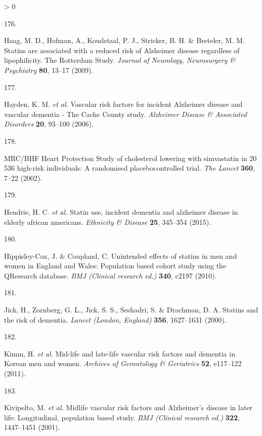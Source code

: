 \documentclass[a4paper, twoside]{templates/ociamthesis}
\newlength{\cslhangindent}
\newlength{\csllabelwidth}
\newenvironment{CSLReferences}[3] %
 {%
  \setlength{\parindent}{0pt}
  \ifodd #1 \everypar{\setlength{\hangindent}{\cslhangindent}}\ignorespaces\fi
  \ifnum #2 > 0
  \setlength{\parskip}{#2\baselineskip}
  \fi
 }%
 {}
\newcommand{\CSLLeftMargin}[1]{\parbox[t]{\maxof{\widthof{#1}}{\csllabelwidth}}{#1}}
\newcommand{\CSLRightInline}[1]{\parbox[t]{\linewidth - \csllabelwidth}{#1}}
\begin{document}
\begin{CSLReferences}{0}{0}
\leavevmode\hypertarget{ref-haag2009}{}%
\CSLLeftMargin{176. }
\CSLRightInline{Haag, M. D., Hofman, A., Koudstaal, P. J., Stricker, B. H. \& Breteler, M. M. Statins are associated with a reduced risk of {Alzheimer} disease regardless of lipophilicity. {The Rotterdam Study}. \emph{Journal of Neurology, Neurosurgery \& Psychiatry} \textbf{80}, 13--17 (2009).}

\leavevmode\hypertarget{ref-hayden2006}{}%
\CSLLeftMargin{177. }
\CSLRightInline{Hayden, K. M. \emph{et al.} Vascular risk factors for incident {Alzheimer} disease and vascular dementia - {The Cache County} study. \emph{Alzheimer Disease \& Associated Disorders} \textbf{20}, 93--100 (2006).}

\leavevmode\hypertarget{ref-heartprotectionstudycollaborativegroup2002}{}%
\CSLLeftMargin{178. }
\CSLRightInline{{MRC}/{BHF Heart Protection Study} of cholesterol lowering with simvastatin in 20 536 high-risk individuals: A randomised placebocontrolled trial. \emph{The Lancet} \textbf{360}, 7--22 (2002).}

\leavevmode\hypertarget{ref-hendrie2015}{}%
\CSLLeftMargin{179. }
\CSLRightInline{Hendrie, H. C. \emph{et al.} Statin use, incident dementia and alzheimer disease in elderly african americans. \emph{Ethnicity \& Disease} \textbf{25}, 345--354 (2015).}

\leavevmode\hypertarget{ref-hippisley-cox2010a}{}%
\CSLLeftMargin{180. }
\CSLRightInline{Hippisley-Cox, J. \& Coupland, C. Unintended effects of statins in men and women in {England} and {Wales}: Population based cohort study using the {QResearch} database. \emph{BMJ (Clinical research ed.)} \textbf{340}, c2197 (2010).}

\leavevmode\hypertarget{ref-jick2000}{}%
\CSLLeftMargin{181. }
\CSLRightInline{Jick, H., Zornberg, G. L., Jick, S. S., Seshadri, S. \& Drachman, D. A. Statins and the risk of dementia. \emph{Lancet (London, England)} \textbf{356}, 1627--1631 (2000).}

\leavevmode\hypertarget{ref-kimm2011}{}%
\CSLLeftMargin{182. }
\CSLRightInline{Kimm, H. \emph{et al.} Mid-life and late-life vascular risk factors and dementia in {Korean} men and women. \emph{Archives of Gerontology \& Geriatrics} \textbf{52}, e117--122 (2011).}

\leavevmode\hypertarget{ref-kivipelto2001}{}%
\CSLLeftMargin{183. }
\CSLRightInline{Kivipelto, M. \emph{et al.} Midlife vascular risk factors and {Alzheimer}'s disease in later life: Longitudinal, population based study. \emph{BMJ (Clinical research ed.)} \textbf{322}, 1447--1451 (2001).}


\end{CSLReferences}
\end{document}
